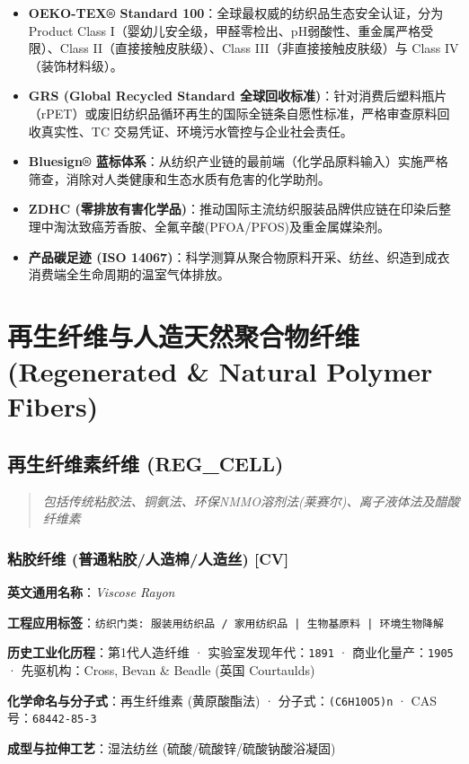 \documentclass[11pt,openright,twoside,UTF8]{ctexbook}
\begin{document}
\begin{itemize}
    \item \textbf{OEKO-TEX® Standard 100}：全球最权威的纺织品生态安全认证，分为 Product Class I（婴幼儿安全级，甲醛零检出、pH弱酸性、重金属严格受限）、Class II（直接接触皮肤级）、Class III（非直接接触皮肤级）与 Class IV（装饰材料级）。
    \item \textbf{GRS (Global Recycled Standard 全球回收标准)}：针对消费后塑料瓶片（rPET）或废旧纺织品循环再生的国际全链条自愿性标准，严格审查原料回收真实性、TC 交易凭证、环境污水管控与企业社会责任。
    \item \textbf{Bluesign® 蓝标体系}：从纺织产业链的最前端（化学品原料输入）实施严格筛查，消除对人类健康和生态水质有危害的化学助剂。
    \item \textbf{ZDHC (零排放有害化学品)}：推动国际主流纺织服装品牌供应链在印染后整理中淘汰致癌芳香胺、全氟辛酸(PFOA/PFOS)及重金属媒染剂。
    \item \textbf{产品碳足迹 (ISO 14067)}：科学测算从聚合物原料开采、纺丝、织造到成衣消费端全生命周期的温室气体排放。
\end{itemize}

\part{再生纤维与人造天然聚合物纤维 (Regenerated \& Natural Polymer Fibers)}

\chapter{再生纤维素纤维 (REG\_CELL)}
\begin{quote}
\small\itshape
包括传统粘胶法、铜氨法、环保NMMO溶剂法(莱赛尔)、离子液体法及醋酸纤维素
\end{quote}

\section{粘胶纤维 (普通粘胶/人造棉/人造丝) [CV]}
\label{sec:cv}

\noindent\textbf{英文通用名称}：\textit{Viscose Rayon}\par
\noindent\textbf{工程应用标签}：\texttt{纺织门类: 服装用纺织品 / 家用纺织品 | 生物基原料 | 环境生物降解}\par
\noindent\textbf{历史工业化历程}：第1代人造纤维 · 实验室发现年代：\texttt{1891} · 商业化量产：\texttt{1905} · 先驱机构：Cross, Bevan \& Beadle (英国 Courtaulds)\par
\noindent\textbf{化学命名与分子式}：再生纤维素 (黄原酸酯法) · 分子式：\texttt{(C6H10O5)n} · CAS 号：\texttt{68442-85-3}\par
\noindent\textbf{成型与拉伸工艺}：湿法纺丝 (硫酸/硫酸锌/硫酸钠酸浴凝固)\par
\end{document}
